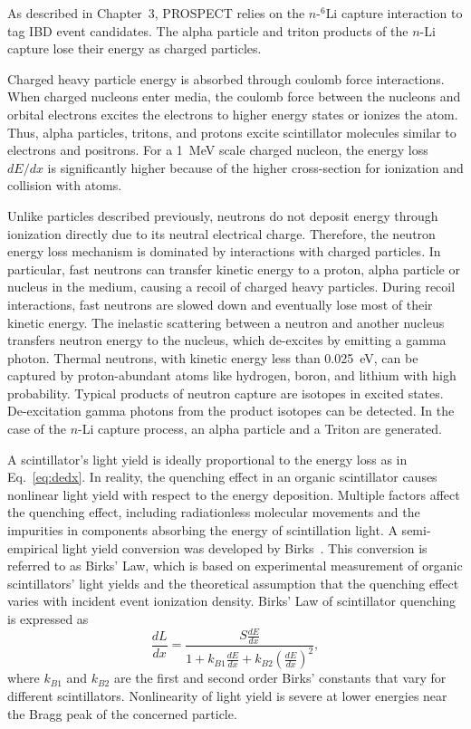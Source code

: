 As described in Chapter~3, PROSPECT relies on the $n$-$^6$Li capture interaction to tag IBD event candidates. 
The alpha particle and triton products of the $n$-Li capture lose their energy as charged particles.

Charged heavy particle energy is absorbed through coulomb force interactions.
When charged nucleons enter media, the coulomb force between the nucleons and orbital electrons excites the electrons to higher energy states or ionizes the atom.
Thus, alpha particles, tritons, and protons excite scintillator molecules similar to electrons and positrons. 
For a 1~MeV scale charged nucleon, the energy loss $dE/dx$ is significantly higher because of the higher cross-section for ionization and collision with atoms.

Unlike particles described previously, neutrons do not deposit energy through ionization directly due to its neutral electrical charge.
Therefore, the neutron energy loss mechanism is dominated by interactions with charged particles.
In particular, fast neutrons can transfer kinetic energy to a proton, alpha particle or nucleus in the medium, causing a recoil of charged heavy particles.
During recoil interactions, fast neutrons are slowed down and eventually lose most of their kinetic energy.
The inelastic scattering between a neutron and another nucleus transfers neutron energy to the nucleus, which de-excites by emitting a gamma photon.
Thermal neutrons, with kinetic energy less than 0.025~eV, can be captured by proton-abundant atoms like hydrogen, boron, and lithium with high probability. 
Typical products of neutron capture are isotopes in excited states. 
De-excitation gamma photons from the product isotopes can be detected.
In the case of the $n$-Li capture process, an alpha particle and a Triton are generated.


A scintillator's light yield is ideally proportional to the energy loss as in Eq.~\ref{eq:dedx}.
In reality, the quenching effect in an organic scintillator causes nonlinear light yield with respect to the energy deposition.
Multiple factors affect the quenching effect, including radiationless molecular movements and the impurities in components absorbing the energy of scintillation light.
A semi-empirical light yield conversion was developed by Birks~\cite{bib:birks, bib:birksbook}. 
This conversion is referred to as Birks' Law, which is based on experimental measurement of organic scintillators' light yields and the theoretical assumption that the quenching effect varies with incident event ionization density. 
Birks' Law of scintillator quenching is expressed as
\begin{equation}
\frac{dL}{dx} = \frac{S\frac{dE}{dx}}{1+k_{B1}\frac{dE}{dx} + k_{B2}(\frac{dE}{dx})^2},
\end{equation}
where $k_{B1}$ and $k_{B2}$ are the first and second order Birks' constants that vary for different scintillators.
Nonlinearity of light yield is severe at lower energies near the Bragg peak of the concerned particle. 

